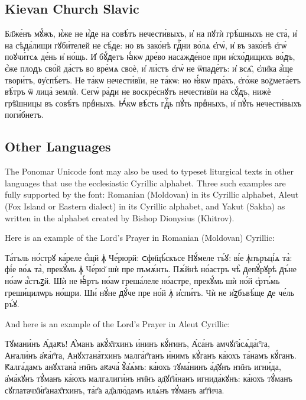 \subsection{Kievan Church Slavic}

\begin{russian}
{\glyphfont \large
Бл҃же́нъ мꙋ́жъ, и҆́же не и҆́ᲁе на совѣ́тъ нечести́выхъ, и҆ на пꙋтѝ грѣ́шныхъ не ста̀, и҆ на сѣᲁа́лищи гꙋби́телей не сѣ́ᲁе: но въ зако́нѣ гᲁⷭ҇ни во́лѧ є҆гѡ̀, и҆ въ зако́нѣ є҆гѡ̀ поꙋчи́тсѧ де́нь и҆ но́щь. И҆ бꙋ́ᲁетъ ꙗ҆́кѡ дре́во насажᲁе́ное при и҆схо́ᲁищихъ во́ᲁъ, є҆́же плоᲁъ сво́й да́стъ во вре́мѧ своѐ, и҆ ли́стъ є҆гѡ̀ не ѿпаᲁе́тъ: и҆ всѧ̑, є҆ли̑ка а҆́ще твори́тъ, ᲂу҆спѣ́етъ. Не та́кѡ нечести́вїи, не та́кѡ: но ꙗ҆́кѡ пра́хъ, є҆го́же воꙁмета́етъ вѣ́тръ ѿ лица̀ землѝ. Сегѡ̀ ра́ᲁи не воскре́снꙋтъ нечести́вїи на сꙋ́ᲁъ, нижѐ грѣ̑шницы въ совѣ́тъ првⷣныхъ. Ꙗ҆́кѡ вѣ́сть гᲁⷭ҇ь пꙋ́ть првⷣныхъ, и҆ пꙋ́ть нечести́выхъ поги́бнетъ.
}
\end{russian}

\subsection{Other Languages}
The Ponomar Unicode font may also be used to typeset liturgical texts in other languages that use the ecclesiastic Cyrillic alphabet. Three such examples
are fully supported by the font: Romanian (Moldovan) in its Cyrillic alphabet, Aleut (Fox Island or Eastern dialect) in its Cyrillic alphabet, and Yakut (Sakha) as written in the alphabet created by Bishop Dionysius (Khitrov).

Here is an example of the Lord's Prayer in Romanian (Moldovan) Cyrillic: \\

\begin{russian}
{\glyphfont \large 
Та́тъль но́стрꙋ ка́реле є҆́щй ꙟ҆ Че́рюрй: ᲃ︀фн҃цѣ́скъсе Нꙋ́меле тъ́ꙋ: ві́е ꙟ҆пъръці́ѧ та̀: фі́е во́ѧ та̀, прекꙋ́мь ꙟ҆ Че́рю̆ шѝ пре пъмѫ́нть. Пѫ́йнѣ но́астръ чѣ̀ ᲁепꙋ́рꙋрѣ ᲁъ́не но́аѡ а҆́стъꙁй. Шѝ не ꙗ҆́ртъ но́аѡ греша́леле но́астре, прекꙋ́мь шѝ но́й є҆ртъ́мь греши́цилѡрь но́щри. Ши́ нꙋ́не ᲁꙋ́че пре но́й ꙟ҆ и҆спи́тъ. Чѝ не и҆ꙁбъвѣ́ще ᲁе че́ль ръ́ꙋ. 
} \\
\end{russian}

And here is an example of the Lord's Prayer in Aleut Cyrillic: \\

\begin{russian}
{\glyphfont \large
Тꙋмани́нъ А́даԟъ! А҆́манъ акꙋ́х̑тхинъ и́нинъ кꙋ́ҥинъ, А́са́нъ амчꙋг̑а́сѧ́да́г̑та, Аҥали́нъ а҆ԟа́г̑та, Анꙋхтана́тхинъ малга́г̑танъ и́нимъ кꙋ́ганъ ка́юхъ та́намъ кꙋ́ганъ. Ԟалга́дамъ анꙋхтана̀ ҥи̑нъ аԟача́ ꙋ̆а҆ѧ́мъ: ка́юхъ тꙋма́нинъ а́д̑ꙋнъ ҥи̑нъ игни́да, а҆ма́кꙋнъ тꙋ́манъ ка́юхъ малгалиги́нъ ҥи̑нъ ад̑ꙋг̑и́нанъ игнида́кꙋнъ: ка́юхъ тꙋ́манъ сꙋглатачх̑и́г̑анах̑тхинъ, та́г̑а ад̑алю́дамъ илѧ́нъ тꙋ́манъ аг̑г̑ича.
} \\
\end{russian}

